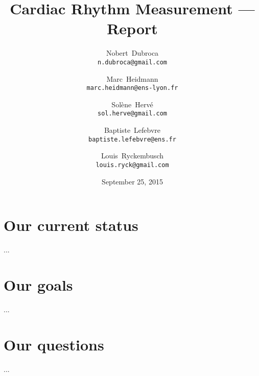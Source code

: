 \documentclass[a4paper]{article}
\title{Cardiac Rhythm Measurement --- Report}
\author{Nobert~Dubroca \\ \small{\texttt{n.dubroca@gmail.com}}
  \and Marc~Heidmann \\ \small{\texttt{marc.heidmann@ens-lyon.fr}}
  \and Sol\`{e}ne~Herv\'{e} \\ \small{\texttt{sol.herve@gmail.com}}
  \and Baptiste~Lefebvre \\ \small{\texttt{baptiste.lefebvre@ens.fr}}
  \and Louis~Ryckembusch \\ \small{\texttt{louis.ryck@gmail.com}}}
\date{September 25, 2015}
\begin{document}
\maketitle


\section{Our current status}

...


\section{Our goals}

...


\section{Our questions}

...
\end{document}
